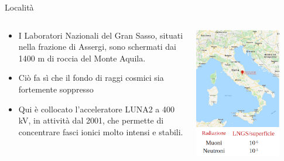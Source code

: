 \documentclass [xcolor=svgnames] {beamer}
\begin{document}
	\begin{frame}{Località}
		\begin{columns}
			\begin{column}{0.5\textwidth}
				\begin{itemize}
					\item<1-> I Laboratori Nazionali del Gran Sasso, situati nella frazione di Assergi, sono schermati dai 1400 m di roccia del Monte Aquila.
					\item<2-> Ciò fa sì che il fondo di raggi cosmici sia fortemente soppresso
					\item<3-> Qui è collocato l'acceleratore LUNA2 a 400 kV, in attività dal 2001, che permette di concentrare fasci ionici molto intensi e stabili.
				\end{itemize}
			\end{column}
			\begin{column}{0.5\textwidth}
				\centering
				\includegraphics[width=0.8\textwidth]{img/location.png}
			\end{column}
		\end{columns}
	\end{frame}
	
\end{document}
